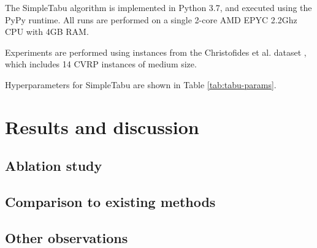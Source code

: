 \documentclass{report}
\begin{document}
The SimpleTabu algorithm is implemented in Python 3.7, and executed using the PyPy \cite{rigo2006pypy} runtime. All runs are performed on a single 2-core AMD EPYC 2.2Ghz CPU with 4GB RAM.

Experiments are performed using instances from the Christofides et al. dataset \cite{christofides1976vehicle}, which includes 14 CVRP instances of medium size.

Hyperparameters for SimpleTabu are shown in Table \ref{tab:tabu-params}.



\section{Results and discussion}
\subsection{Ablation study}



\subsection{Comparison to existing methods}



\subsection{Other observations}
\end{document}
